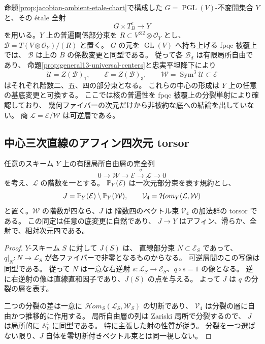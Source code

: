 命題\ref{prop:jacobian-ambient-etale-chart}で構成した
$G=\operatorname{PGL}(V)$-不変開集合 $Y$ と、その étale 全射
\[
 G\times T_B^e\longrightarrow Y
\]
を用いる。$Y$ 上の普遍関係部分束を $R\subset V^{\otimes2}\otimes\mathcal O_Y$ とし、
$\mathcal B=T(V\otimes\mathcal O_Y)/(R)$ と置く。
$G$ の元を $\operatorname{GL}(V)$ へ持ち上げる fpqc 被覆上では、
$\mathcal B$ は上の $B$ の係数変更と同型である。
従って各 $\mathcal B_d$ は有限局所自由であり、
命題\ref{prop:general13-universal-centers}と忠実平坦降下により
\[
 \mathcal U=Z(\mathcal B)_1,
 \qquad \mathcal E=Z(\mathcal B)_3,
 \qquad \mathcal W=\operatorname{Sym}^3\mathcal U\subset\mathcal E
\]
はそれぞれ階数二、五、四の部分束となる。
これらの中心の形成は $Y$ 上の任意の基底変更と可換する。
ここでは核の普遍性を fpqc 被覆上の分裂単射により確認しており、
幾何ファイバーの次元だけから非被約な底への結論を出していない。
商 $\mathcal L=\mathcal E/\mathcal W$ は可逆層である。

\subsection{中心三次直線のアフィン四次元 torsor}

\begin{lemma}
\label{lem:central-cubic-splitting-torsor}
任意のスキーム $Y$ 上の有限局所自由層の完全列
\[
 0\longrightarrow\mathcal W\longrightarrow\mathcal E
   \xrightarrow{q}\mathcal L\longrightarrow0
\]
を考え、$\mathcal L$ の階数を一とする。
$\mathbb P_Y(\mathcal E)$ は一次元部分束を表す規約とし、
\[
 J=\mathbb P_Y(\mathcal E)\setminus\mathbb P_Y(\mathcal W),
 \qquad \mathcal V_4=\mathcal Hom_Y(\mathcal L,\mathcal W)
\]
と置く。$\mathcal W$ の階数が四なら、$J$ は
階数四のベクトル束 $\mathcal V_4$ の加法群の torsor である。
この同定は任意の底変更に自然であり、
$J\to Y$ はアフィン、滑らか、全射で、相対次元四である。
\end{lemma}

\begin{proof}
$Y$-スキーム $S$ に対して $J(S)$ は、
直線部分束 $N\subset\mathcal E_S$ であって、
$q|_N:N\to\mathcal L_S$ が各ファイバーで非零となるものからなる。
可逆層間のこの写像は同型である。
従って $N$ は一意な右逆射
$s:\mathcal L_S\to\mathcal E_S$、$q\circ s=1$ の像となる。
逆に右逆射の像は直線直和因子であり、$J(S)$ の点を与える。
よって $J$ は $q$ の分裂の層を表す。

二つの分裂の差は一意に
$\mathcal Hom_S(\mathcal L_S,\mathcal W_S)$ の切断であり、
$\mathcal V_4$ は分裂の層に自由かつ推移的に作用する。
局所自由層の列は Zariski 局所で分裂するので、
$J$ は局所的に $\mathbb A^4_Y$ に同型である。
特に主張した射の性質が従う。
分裂を一つ選ばない限り、$J$ 自体を零切断付きベクトル束とは同一視しない。
\end{proof}

